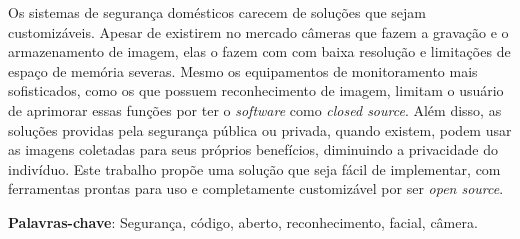 \documentclass[12pt, %
openright, 
oneside, %
a4paper,    %
brazil]{facom-ufu-abntex2}
\begin{document}



\begin{resumo} %
  Os sistemas de segurança domésticos carecem de soluções
  que sejam customizáveis. Apesar de existirem no mercado câmeras que fazem a gravação e o armazenamento de
  imagem, elas o fazem com com baixa resolução e limitações de espaço de memória severas. Mesmo os equipamentos
  de monitoramento mais sofisticados, como os que possuem reconhecimento de imagem, limitam o usuário de aprimorar
  essas funções por ter o \textit{\foreignlanguage{english}{software}} como \textit{\foreignlanguage{english}{closed source}}.
  Além disso, as soluções providas pela segurança pública ou privada, quando existem, podem usar as imagens
  coletadas para seus próprios benefícios, diminuindo a privacidade do indivíduo. Este trabalho propõe uma solução que seja
  fácil de implementar, com ferramentas prontas para uso e completamente customizável por ser \textit{\foreignlanguage{english}{open source}}.

  \vspace{\onelineskip}

  \noindent
  \textbf{Palavras-chave}: Segurança, código,  aberto, reconhecimento, facial, câmera.  %
\end{resumo}

\listoffigures*
\cleardoublepage

\listoftables*
\cleardoublepage
\end{document}
